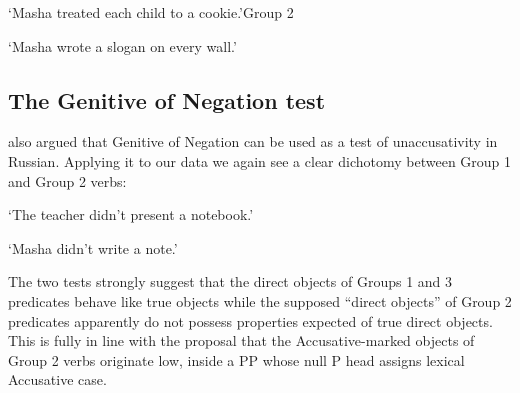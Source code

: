 \documentclass[output=paper,colorlinks,citecolor=brown,modfonts,nonflat]{langsci/langscibook}
\begin{document}
\ea[*]{%
    \label{ex:antonyuk:23}
    \gll    Maša ugosti-l-a po rebenk-u (kak-im-to pečen’je-m).\\
            Masha treat\textsc{-pst-f} \textsc{distr} child\textsc{-dat} \hspaceThis{[}some\textsc{-ins.m-ind} cookie\textsc{-ins.m}\\}
    \glt    `Masha treated each child to a cookie.'\hfill{Group 2}
    \z

    \glt    `Masha wrote a slogan on every wall.'
    \z

\subsection{The Genitive of Negation test}\label{sec:antonyuk:3.2}

\citet{Pesetsky1982} also argued that Genitive of Negation can be used as a test of unaccusativity in Russian. Applying it to our data we again see a clear dichotomy between Group 1 and Group 2 verbs:

    \glt    `The teacher didn’t present a notebook.'
    \z

    \z

    \glt    `Masha didn’t write a note.'
    \z

The two tests strongly suggest that the direct objects of Groups 1 and 3 predicates behave like true objects while the supposed “direct objects” of Group 2 predicates apparently do not possess properties expected of true direct objects. This is fully in line with the proposal that the Accusative-marked objects of Group 2 verbs originate low, inside a PP whose null P head assigns lexical Accusative case.
\end{document}
